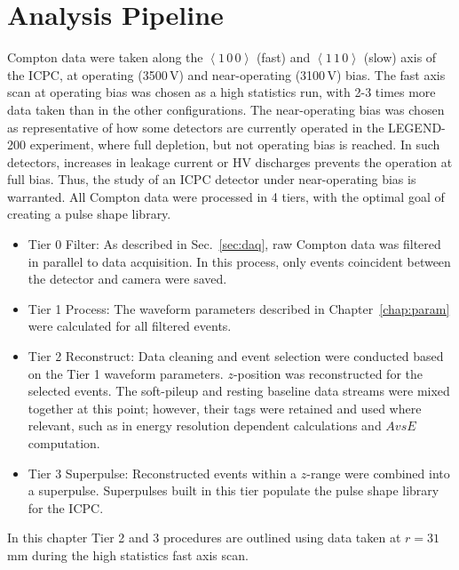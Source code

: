 \chapter{Analysis Pipeline}\label{chap:pipeline}
Compton data were taken along the $\left<1\,0\,0\right>$ (fast) and $\left<1\,1\,0\right>$ (slow) axis of the ICPC, at operating (3500\,V) and near-operating (3100\,V) bias. The fast axis scan at operating bias was chosen as a high statistics run, with 2-3 times more data taken than in the other configurations. The near-operating bias was chosen as representative of how some detectors are currently operated in the LEGEND-200 experiment, where full depletion, but not operating bias is reached. In such detectors, increases in leakage current or HV discharges prevents the operation at full bias. Thus, the study of an ICPC detector under near-operating bias is warranted. All Compton data were processed in 4 tiers, with the optimal goal of creating a pulse shape library. 
\begin{itemize}
	\item Tier 0 Filter: As described in Sec.~\ref{sec:daq}, raw Compton data was filtered in parallel to data acquisition. In this process, only events coincident between the detector and camera were saved.
	\item Tier 1 Process: The waveform parameters described in Chapter~\ref{chap:param} were calculated for all filtered events. 
	\item Tier 2 Reconstruct: Data cleaning and event selection were conducted based on the Tier 1 waveform parameters. $z$-position was reconstructed for the selected events. The soft-pileup and resting baseline data streams were mixed together at this point; however, their tags were retained and used where relevant, such as in energy resolution dependent calculations and $AvsE$ computation.
	\item Tier 3 Superpulse: Reconstructed events within a $z$-range were combined into a superpulse. Superpulses built in this tier populate the pulse shape library for the ICPC.
\end{itemize}
In this chapter Tier 2 and 3 procedures are outlined using data taken at $r = 31$\,mm during the high statistics fast axis scan. 

